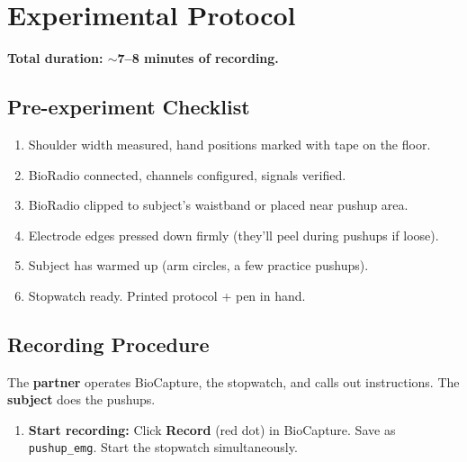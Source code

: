 \documentclass[11pt,letterpaper]{article}
\begin{document}
\section{Experimental Protocol}

\textbf{Total duration: $\sim$7--8 minutes of recording.}

\subsection{Pre-experiment Checklist}

\begin{enumerate}[nosep]
    \item[$\square$] Shoulder width measured, hand positions marked with tape on the floor.
    \item[$\square$] BioRadio connected, channels configured, signals verified.
    \item[$\square$] BioRadio clipped to subject's waistband or placed near pushup area.
    \item[$\square$] Electrode edges pressed down firmly (they'll peel during pushups if loose).
    \item[$\square$] Subject has warmed up (arm circles, a few practice pushups).
    \item[$\square$] Stopwatch ready.  Printed protocol + pen in hand.
\end{enumerate}

\subsection{Recording Procedure}

The \textbf{partner} operates BioCapture, the stopwatch, and calls out instructions.  The \textbf{subject} does the pushups.

\begin{enumerate}
    \item \textbf{Start recording:} Click \textbf{Record} (red dot) in BioCapture.  Save as \texttt{pushup\_emg}.  Start the stopwatch simultaneously.
\end{enumerate}
\end{document}
